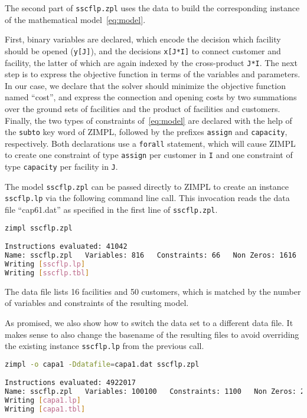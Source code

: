 \documentclass[a4paper,10pt]{article}
\begin{document}
The second part of \texttt{sscflp.zpl} uses the data to build the corresponding instance of the mathematical model~\eqref{eq:model}.
%

\resizebox{\textwidth}{!}{
  
}
%
First, binary variables are declared, which encode the decision which facility should be opened (\texttt{y[J]}),
and the decisions \texttt{x[J*I]} to connect customer and facility, the latter of which are again indexed by the cross-product \texttt{J*I}.
%
The next step is to express the objective function in terms of the variables and parameters.
%
In our case, we declare that the solver should minimize the objective function named ``cost'', and express the connection and opening costs by two summations over the ground sets of facilities and the product of facilities and customers.
%
Finally, the two types of constraints of~\eqref{eq:model} are declared with the help of the \texttt{subto} key word of ZIMPL, followed by the prefixes \texttt{assign} and \texttt{capacity}, respectively.
%
Both declarations use a \texttt{forall} statement, which will cause ZIMPL to create one constraint of type \texttt{assign} per customer in \texttt{I} and one constraint of type \texttt{capacity} per facility in \texttt{J}.

The model \texttt{sscflp.zpl} can be passed directly to ZIMPL to create an instance \texttt{sscflp.lp} via the following command line call.
This invocation reads the data file ``cap61.dat'' as specified in
the first line of \texttt{sscflp.zpl}.

\begin{lstlisting}[language=bash,caption=ZIMPL command line invokation]
zimpl sscflp.zpl

Instructions evaluated: 41042
Name: sscflp.zpl   Variables: 816   Constraints: 66   Non Zeros: 1616
Writing [sscflp.lp]
Writing [sscflp.tbl]
\end{lstlisting}

The data file lists 16 facilities and 50 customers, which is matched by the number of variables and constraints of the resulting model.
%

As promised, we also show how to switch the data set to a different data file.
%
It makes sense to also change the basename of the resulting files to avoid overriding the existing instance \texttt{sscflp.lp} from the previous call.

\begin{lstlisting}[language=bash,caption=ZIMPL command line invokation with options]
zimpl -o capa1 -Ddatafile=capa1.dat sscflp.zpl

Instructions evaluated: 4922017
Name: sscflp.zpl   Variables: 100100   Constraints: 1100   Non Zeros: 200100
Writing [capa1.lp]
Writing [capa1.tbl]
\end{lstlisting}
\end{document}
